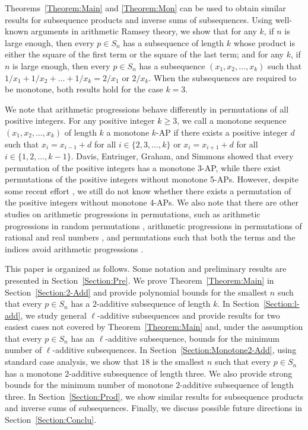 \documentclass[11pt]{article}
\theoremstyle{definition}
\begin{document}
Theorems~\ref{Theorem:Main} and \ref{Theorem:Mon} can be used to obtain similar results for subsequence products and inverse sums of subsequences. Using well-known arguments in arithmetic Ramsey theory, we show that for any $k$, if $n$ is large enough, then every $p\in S_n$ has a subsequence of length $k$ whose product is either the square of the first term or the square of the last term; and for any $k$, if $n$ is large enough, then every $p\in S_n$ has a subsequence $(x_1,x_2,\ldots,x_k)$ such that $1/x_1+1/x_2+\ldots+1/x_k=2/x_1$ or $2/x_k$. When the subsequences are required to be monotone, both results hold for the case $k=3$.

We note that arithmetic progressions behave differently in permutations of all positive integers. For any positive integer $k\geq3$, we call a monotone sequence $(x_1,x_2,\ldots,x_k)$ of length $k$ a monotone $k$-AP if there exists a positive integer $d$ such that $x_i=x_{i-1}+d$ for all $i\in\{2,3,\ldots,k\}$ or $x_{i}=x_{i+1}+d$ for all $i\in\{1,2,\ldots,k-1\}$. Davis, Entringer, Graham, and Simmons \cite{DEGS1977} showed that every permutation of the positive integers has a monotone $3$-AP, while there exist permutations of the positive integers without monotone 5-APs. However, despite some recent effort \cite{Adenwalla2024,Geneson2019,LeSaulnierVijay2011}, we still do not know whether there exists a permutation of the positive integers without monotone 4-APs. We also note that there are other studies on arithmetic progressions in permutations, such as arithmetic progressions in random permutations \cite{GZ2021}, arithmetic progressions in permutations of rational and real numbers \cite{ABJ2011}, and permutations such that both the terms and the indices avoid arithmetic progressions \cite{ES2017,Hegarty2004,HM2015,JS2015,SS2018}.

This paper is organized as follows. Some notation and preliminary results are presented in Section~\ref{Section:Pre}.  We prove Theorem~\ref{Theorem:Main} in Section~\ref{Section:2-Add} and provide polynomial bounds for the smallest $n$ such that every $p\in S_n$ has a $2$-additive subsequence of length $k$. In Section~\ref{Section:l-add}, we study general $\ell$-additive subsequences and provide results for two easiest cases not covered by Theorem~\ref{Theorem:Main} and, under the assumption that every $p\in S_n$ has an $\ell$-additive subsequence, bounds for the minimum number of $\ell$-additive subsequences. In Section~\ref{Section:Monotone2-Add}, using standard case analysis, we show that $18$ is the smallest $n$ such that every $p\in S_{n}$ has a monotone $2$-additive subsequence of length three. We also provide strong bounds for the minimum number of monotone $2$-additive subsequence of length three. In Section~\ref{Section:Prod}, we show similar results for subsequence products and inverse sums of subsequences. Finally, we discuss possible future directions in Section~\ref{Section:Conclu}.
\end{document}
